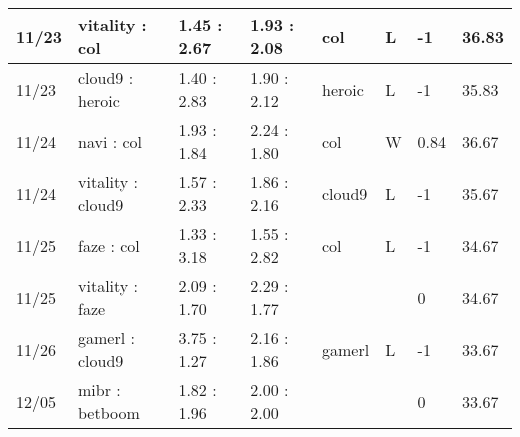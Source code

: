 \begin{small}
\begin{longtable}{|l|l|l|l|l|l|l|l|}
	11/23                               & vitality : col                      & 1.45 : 2.67                             & 1.93 : 2.08                             & col                               & L                                 & -1                                   & 36.83                             \\ \hline
	11/23                               & cloud9 : heroic                     & 1.40 : 2.83                             & 1.90 : 2.12                             & heroic                            & L                                 & -1                                   & 35.83                             \\ \hline
	11/24                               & navi : col                          & 1.93 : 1.84                             & 2.24 : 1.80                             & col                               & W                                 & 0.84                                 & 36.67                             \\ \hline
	11/24                               & vitality : cloud9                   & 1.57 : 2.33                             & 1.86 : 2.16                             & cloud9                            & L                                 & -1                                   & 35.67                             \\ \hline
	11/25                               & faze : col                          & 1.33 : 3.18                             & 1.55 : 2.82                             & col                               & L                                 & -1                                   & 34.67                             \\ \hline
	11/25                               & vitality : faze                     & 2.09 : 1.70                             & 2.29 : 1.77                             &                                   &                                   & 0                                    & 34.67                             \\ \hline
	11/26                               & gamerl : cloud9                     & 3.75 : 1.27                             & 2.16 : 1.86                             & gamerl                            & L                                 & -1                                   & 33.67                             \\ \hline
	12/05                               & mibr : betboom                      & 1.82 : 1.96                             & 2.00 : 2.00                             &                                   &                                   & 0                                    & 33.67                             \\ \hline

\end{longtable}
\end{small}
